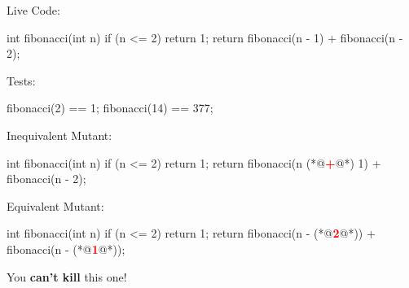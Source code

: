 \documentclass{article}
\begin{document}
\begin{pptWide}{3}
Live Code:\par
{\small\begin{ffcode}
int fibonacci(int n) {
  if (n <= 2) {
    return 1;
  }
  return fibonacci(n - 1)
    + fibonacci(n - 2);
}
\end{ffcode}
}
\par
Tests:\par
{\small\begin{ffcode}
fibonacci(2) == 1;
fibonacci(14) == 377;
\end{ffcode}
}
\par\columnbreak\par
Inequivalent Mutant:\par
{\small\begin{ffcode}
int fibonacci(int n) {
  if (n <= 2) {
    return 1;
  }
  return fibonacci(n (*@\textcolor{red}{\textbf{+}}@*) 1)
    + fibonacci(n - 2);
}
\end{ffcode}
}
\par\columnbreak\par
Equivalent Mutant:\par
{\small\begin{ffcode}
int fibonacci(int n) {
  if (n <= 2) {
    return 1;
  }
  return fibonacci(n - (*@\textcolor{red}{\textbf{2}}@*))
    + fibonacci(n - (*@\textcolor{red}{\textbf{1}}@*));
}
\end{ffcode}
}
\par
You \textbf{can't kill} this one!
\end{pptWide}
\plush{}
\end{document}
